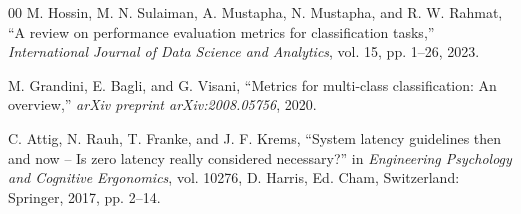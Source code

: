 \begin{thebibliography}{00}
M. Hossin, M. N. Sulaiman, A. Mustapha, N. Mustapha, and R. W. Rahmat, ``A review on performance evaluation metrics for classification tasks,'' \textit{International Journal of Data Science and Analytics}, vol. 15, pp. 1--26, 2023.

M. Grandini, E. Bagli, and G. Visani, ``Metrics for multi-class classification: An overview,'' \textit{arXiv preprint arXiv:2008.05756}, 2020.


C. Attig, N. Rauh, T. Franke, and J. F. Krems, ``System latency guidelines then and now -- Is zero latency really considered necessary?'' in \textit{Engineering Psychology and Cognitive Ergonomics}, vol. 10276, D. Harris, Ed. Cham, Switzerland: Springer, 2017, pp. 2--14.

\end{thebibliography}